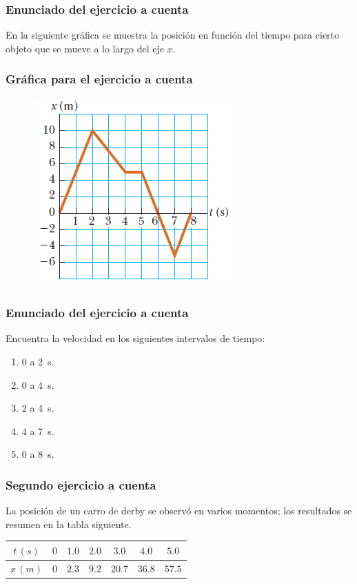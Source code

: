 \documentclass[14pt]{beamer}
\begin{document}
\begin{frame}
\frametitle{Enunciado del ejercicio a cuenta}
En la siguiente gráfica se muestra la posición en función del tiempo para cierto objeto que se mueve a lo largo del eje $x$.
\end{frame}
\begin{frame}
\frametitle{Gráfica para el ejercicio a cuenta}
\begin{figure}
    \centering
    \includegraphics[scale=0.8
    ]{Imagenes/Ejercicio_Cuenta_01.png}
\end{figure}
\end{frame}
\begin{frame}
\frametitle{Enunciado del ejercicio a cuenta}
Encuentra la velocidad en los siguientes intervalos de tiempo:
\begin{enumerate}[<+->]
\item $0$ a \SI{2}{\second}.
\item $0$ a \SI{4}{\second}.
\item $2$ a \SI{4}{\second}.
\item $4$ a \SI{7}{\second}.
\item $0$ a \SI{8}{\second}.
\end{enumerate}
\end{frame}
\begin{frame}
\frametitle{Segundo ejercicio a cuenta}
La posición de un carro de derby se observó en varios momentos; los resultados se resumen en la tabla siguiente.
\pause
\begin{table}
\centering
\begin{tabular}{c | c | c | c | c | c | c}
$t \, (s)$ & $0$ & $1.0$ & $2.0$ & $3.0$ & $4.0$ & $5.0$ \\ \hline
$x \, (m)$ & $0$ & $2.3$ & $9.2$ & $20.7$ & $36.8$ & $57.5$
\end{tabular}
\end{table}
\end{frame}
\end{document}
